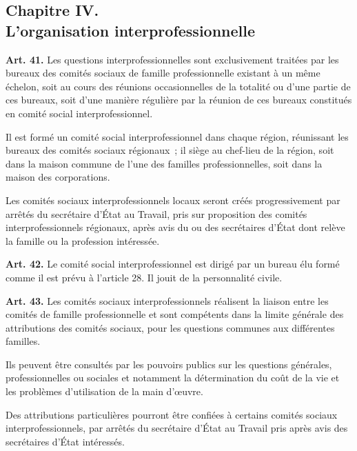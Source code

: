 \documentclass[french,twoside]{book} %
\newcommand{\labelchar}[1]{\textbf{\color{rubric} #1}}
\begin{document}
\subsection[Chapitre IV. L’organisation interprofessionnelle]{Chapitre IV. \\
L’organisation interprofessionnelle}
\noindent \labelchar{Art. 41.} Les questions interprofessionnelles sont exclusivement traitées par les bureaux des comités sociaux de famille professionnelle existant à un même échelon, soit au cours des réunions occasionnelles de la totalité ou d’une partie de ces bureaux, soit d’une manière régulière par la réunion de ces bureaux constitués en comité social interprofessionnel.\par
Il est formé un comité social interprofessionnel dans chaque région, réunissant les bureaux des comités sociaux régionaux ; il siège au chef-lieu de la région, soit dans la maison commune de l’une des familles professionnelles, soit dans la maison des corporations.\par
Les comités sociaux interprofessionnels locaux seront créés progressivement par arrêtés du secrétaire d’État au Travail, pris sur proposition des comités interprofessionnels régionaux, après avis du ou des secrétaires d’État dont relève la famille ou la profession intéressée.\par
\bigbreak
\noindent \labelchar{Art. 42.} Le comité social interprofessionnel est dirigé par un bureau élu formé comme il est prévu à l’article 28. Il jouit de la personnalité civile.\par
\bigbreak
\noindent \labelchar{Art. 43.} Les comités sociaux interprofessionnels réalisent la liaison entre les comités de famille professionnelle et sont compétents dans la limite générale des attributions des comités sociaux, pour les questions communes aux différentes familles.\par
Ils peuvent être consultés par les pouvoirs publics sur les questions générales, professionnelles ou sociales et notamment la détermination du coût de la vie et les problèmes d’utilisation de la main d’œuvre.\par
Des attributions particulières pourront être confiées à certains comités sociaux interprofessionnels, par arrêtés du secrétaire d’État au Travail pris après avis des secrétaires d’État intéressés.
\end{document}
